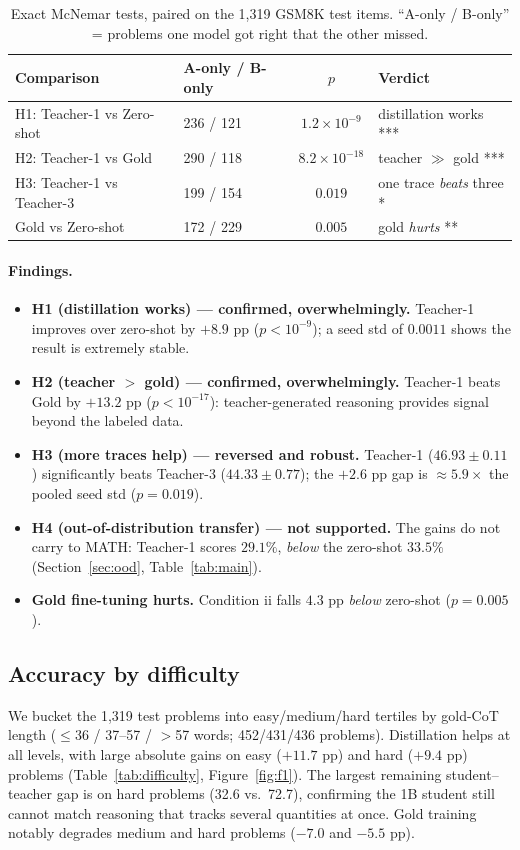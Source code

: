 \documentclass[11pt]{article}
\begin{document}
\begin{table}[H]
\centering
\caption{Exact McNemar tests, paired on the 1{,}319 GSM8K test items.
``A-only / B-only'' = problems one model got right that the other missed.}
\label{tab:mcnemar}
\begin{tabular}{llcl}
\toprule
Comparison & A-only / B-only & $p$ & Verdict \\
\midrule
H1: Teacher-1 vs Zero-shot & 236 / 121 & $1.2\times10^{-9}$  & distillation works *** \\
H2: Teacher-1 vs Gold      & 290 / 118 & $8.2\times10^{-18}$ & teacher $\gg$ gold *** \\
H3: Teacher-1 vs Teacher-3 & 199 / 154 & $0.019$             & one trace \emph{beats} three * \\
Gold vs Zero-shot          & 172 / 229 & $0.005$             & gold \emph{hurts} ** \\
\bottomrule
\end{tabular}
\end{table}

\paragraph{Findings.}
\begin{itemize}
  \item \textbf{H1 (distillation works) --- confirmed, overwhelmingly.} Teacher-1
  improves over zero-shot by $+8.9$ pp ($p<10^{-9}$); a seed std of $0.0011$ shows
  the result is extremely stable.
  \item \textbf{H2 (teacher $>$ gold) --- confirmed, overwhelmingly.} Teacher-1
  beats Gold by $+13.2$ pp ($p<10^{-17}$): teacher-generated reasoning provides
  signal beyond the labeled data.
  \item \textbf{H3 (more traces help) --- reversed and robust.} Teacher-1
  ($46.93\pm0.11$) significantly beats Teacher-3 ($44.33\pm0.77$); the $+2.6$ pp gap
  is $\approx5.9\times$ the pooled seed std ($p=0.019$).
  \item \textbf{H4 (out-of-distribution transfer) --- not supported.} The gains do
  not carry to MATH: Teacher-1 scores $29.1\%$, \emph{below} the zero-shot $33.5\%$
  (Section~\ref{sec:ood}, Table~\ref{tab:main}).
  \item \textbf{Gold fine-tuning hurts.} Condition ii falls $4.3$ pp \emph{below}
  zero-shot ($p=0.005$).
\end{itemize}

\subsection{Accuracy by difficulty}
We bucket the 1{,}319 test problems into easy/medium/hard tertiles by gold-CoT
length ($\le$36 / 37--57 / $>$57 words; 452/431/436 problems). Distillation helps
at all levels, with large absolute gains on easy ($+11.7$ pp) and hard ($+9.4$ pp)
problems (Table~\ref{tab:difficulty}, Figure~\ref{fig:f1}). The largest remaining
student--teacher gap is on hard problems (32.6 vs.\ 72.7), confirming the 1B
student still cannot match reasoning that tracks several quantities at once. Gold
training notably degrades medium and hard problems ($-7.0$ and $-5.5$ pp).
\end{document}
